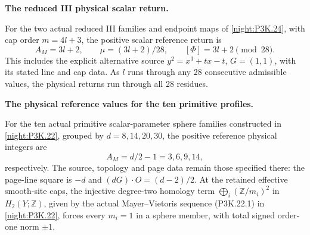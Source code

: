 \begin{proposition}\hypertarget{tag-01U3}{}\label{iv:correction:P3K.24}

\textbf{The reduced III physical scalar return.}\par
For the two actual reduced III families and endpoint maps
of \cref{night:P3K.24}, with cap order \(m=4l+3\), the positive
scalar reference return is
\[
 A_M=3l+2,\qquad \mu=(3l+2)/28,\qquad [\Phi]=3l+2\pmod{28}.
\]
This includes the explicit alternative source
\(y^2=x^3+tx-t\), \(G=(1,1)\), with its stated line and cap data.
As \(l\) runs through any 28 consecutive admissible values, the
physical returns run through all 28 residues.
\end{proposition}

\begin{proposition}\hypertarget{tag-01U1}{}\label{iv:correction:P3K.22}

\textbf{The physical reference values for the ten primitive profiles.}\par
For the ten actual primitive scalar-parameter sphere
families constructed in \cref{night:P3K.22}, grouped by
\(d=8,14,20,30\), the positive reference physical integers are
\[
 A_M=d/2-1=3,6,9,14,
\]
respectively. The source, topology and page data remain those
specified there: the page-line square is \(-d\) and
\((dG)\cdot O=(d-2)/2\). At the retained effective smooth-site caps, the injective
degree-two homology term \(\bigoplus_i(\mathbb Z/m_i)^2\)
in \(H_2(Y;\mathbb Z)\), given by the actual Mayer--Vietoris
sequence (P3K.22.1) in \cref{night:P3K.22}, forces every
\(m_i=1\) in a sphere member, with total signed order-one
norm \(\pm1\).
\end{proposition}

